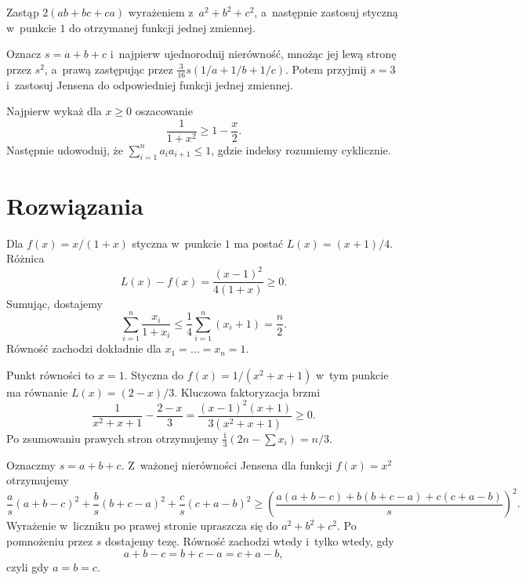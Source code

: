 \documentclass{lecture-kuznia}
\begin{document}
\begin{hint*}[\ref{Z13}]
	Zastąp $2(ab+bc+ca)$ wyrażeniem z~$a^2+b^2+c^2$, a~następnie
	zastosuj styczną w~punkcie $1$ do otrzymanej funkcji jednej zmiennej.
\end{hint*}

\begin{hint*}[\ref{ZHomoJensen}]
	Oznacz $s=a+b+c$ i~najpierw ujednorodnij nierówność, mnożąc jej
	lewą stronę przez $s^2$, a~prawą zastępując przez
	$\frac3{16}s(1/a+1/b+1/c)$. Potem przyjmij $s=3$ i~zastosuj Jensena
	do odpowiedniej funkcji jednej zmiennej.
\end{hint*}

\begin{hint*}[\ref{Z15}]
	Najpierw wykaż dla $x\geqslant0$ oszacowanie
	\[
		\frac1{1+x^2}\geqslant1-\frac x2.
	\]
	Następnie udowodnij, że
	$\sum_{i=1}^n a_ia_{i+1}\leqslant1$, gdzie indeksy rozumiemy cyklicznie.
\end{hint*}

\newpage
\section{Rozwiązania}

\begin{solution*}[\ref{Z1}]
	Dla $f(x)=x/(1+x)$ styczna w~punkcie $1$ ma postać
	$L(x)=(x+1)/4$. Różnica
	\[
		L(x)-f(x)=\frac{(x-1)^2}{4(1+x)}\geqslant0.
	\]
	Sumując, dostajemy
	\[
		\sum_{i=1}^n\frac{x_i}{1+x_i}
		\leqslant\frac14\sum_{i=1}^n(x_i+1)=\frac n2.
	\]
	Równość zachodzi dokładnie dla $x_1=\dots=x_n=1$.
\end{solution*}

\begin{solution*}[\ref{Z2}]
	Punkt równości to $x=1$. Styczna do $f(x)=1/(x^2+x+1)$ w~tym punkcie
	ma równanie $L(x)=(2-x)/3$. Kluczowa faktoryzacja brzmi
	\[
		\frac1{x^2+x+1}-\frac{2-x}{3}
		=\frac{(x-1)^2(x+1)}{3(x^2+x+1)}\geqslant0.
	\]
	Po zsumowaniu prawych stron otrzymujemy
	$\frac13(2n-\sum x_i)=n/3$.
\end{solution*}

\begin{solution*}[\ref{ZKwadratWazony}]
	Oznaczmy $s=a+b+c$. Z~ważonej nierówności Jensena dla funkcji
	$f(x)=x^2$ otrzymujemy
	\[
		\frac{a}{s}(a+b-c)^2+\frac{b}{s}(b+c-a)^2
		+\frac{c}{s}(c+a-b)^2
		\geqslant
		\left(
			\frac{a(a+b-c)+b(b+c-a)+c(c+a-b)}{s}
		\right)^2.
	\]
	Wyrażenie w~liczniku po prawej stronie upraszcza się do
	$a^2+b^2+c^2$. Po pomnożeniu przez $s$ dostajemy tezę.
	Równość zachodzi wtedy i~tylko wtedy, gdy
	\[
		a+b-c=b+c-a=c+a-b,
	\]
	czyli gdy $a=b=c$.
\end{solution*}
\end{document}
